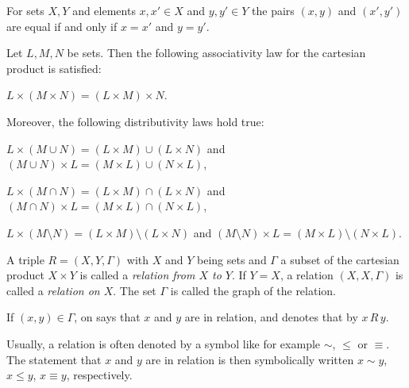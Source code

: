 \begin{proposition}
  For sets $X,Y$ and elements $x, x'\in X$ and $y,y' \in Y$ the pairs $(x,y)$ and $(x',y')$ are equal 
  if and only if $x = x'$ and $y =y'$. 
\end{proposition}

\begin{proposition}
  Let $L, M, N$ be sets. Then the following associativity law for the cartesian product is satisfied:
  \begin{letterlist}
  \item 
      $L \times (M \times N)  = (L \times M) \times N$.
  \end{letterlist}
  Moreover, the following distributivity laws hold true:
  \begin{letterlist}\setcounter{enumi}{1}
  \item 
      $L \times (M \cup N)  = (L \times M) \cup (L \times N)$ and   
      $(M \cup N) \times L = (M \times L) \cup (N \times L)$,
  \item
      $L \times (M \cap N)  = (L \times M) \cap (L \times N)$ and   
      $(M \cap N) \times L = (M \times L) \cap (N \times L)$, 
  \item
      $L \times (M \setminus N)  = (L \times M) \setminus (L \times N)$ and   
      $(M \setminus N) \times L = (M \times L) \setminus (N \times L)$.
  \end{letterlist}
\end{proposition}



\begin{definition}
  A triple $R = (X,Y,\Gamma)$ with $X$ and $Y$ being sets and $\Gamma$ a subset of the cartesian product 
  $X\times Y$ is called a \emph{relation from $X$ to $Y$}. If $Y=X$, a relation $(X,X,\Gamma)$ is called
  a \emph{relation on $X$}. The set $\Gamma$ is called the graph of the relation. 

  If $(x,y) \in \Gamma$, on says that $x$ and $y$ are in relation, and denotes that by $x \, R \, y$. 
\end{definition}

\begin{remark}
  Usually, a relation is often denoted by a symbol like for example $\sim$, $\leq$ or $\equiv$.
  The statement that $x$ and $y$ are in relation is then symbolically written 
  $x \sim y$, $x \leq y$, $x \equiv y$, respectively.  
\end{remark}

